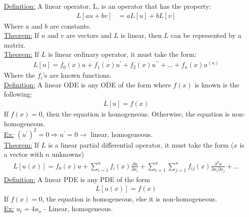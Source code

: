 \documentclass{article}
\newcommand{\p}{\partial }
\newcommand{\ex}{\underline{Ex:} }
\newcommand{\dfn}{\underline{Definition:} }
\newcommand{\thm}{\underline{Theorem:} }
\begin{document}
\dfn A linear operator, L, is an operator that has the property:
\begin{align}
  L[au + bv] & = aL[u] + bL[v]
\end{align}
Where $a$ and $b$ are constants.\\
\thm If $u$ and $v$ are vectors and $L$ is linear, then $L$ can be represented by a matrix.\\
\thm If $L$ is linear ordinary operator, it must take the form:
\begin{align}
  L[u] = f_0(x)u + f_1(x)u^\prime + f_2(x)u^{\prime\prime} + \ldots + f_n(x)u^{(n)}
\end{align}
Where the $f_i$'s are known functions.\\
\dfn A linear ODE is any ODE of the form where $f(x)$ is known is the following:
\begin{align}
  L[u] = f(x)
\end{align}
If $f(x) = 0$, then the equation is homogeneous. Otherwise, the equation is non-homogeneous.\\
\ex $(u^\prime)^2 = 0 \Rightarrow u^\prime = 0 \rightarrow$ linear, homogeneous.\\
\thm If $L$ is a linear partial differential operator, it must take the form ($x$ is a vector with $n$ unknowns)
\begin{align}
  L[u(x)] = f_0(x)u + \sum^n_{i = 1} f_i(x) \frac{\partial u}{\partial x_i} +
  \sum^n_{i = 1} \sum^n_{j = 1} f_{ij}(x) \frac{\p^2 u}{\p x_i \p x_j} + \ldots
\end{align}
\dfn A linear PDE is any PDE of the form
\begin{align}
  L[u(x)] = f(x)
\end{align}
If $f(x) = 0$, the equation is homogeneous, else it is non-homogeneous.\\
\ex $u_t = 4u_x$ - Linear, homogeneous.
\end{document}
